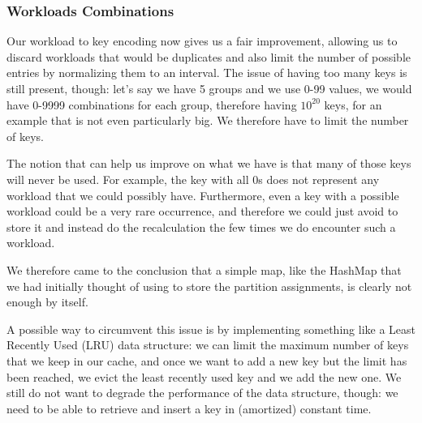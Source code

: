 \subsubsection{Workloads Combinations}\label{sec:Workloads-combinations}
Our workload to key encoding now gives us a fair improvement, allowing us to discard workloads that would be duplicates and also limit the number of possible entries by normalizing them to an interval. The issue of having too many keys is still present, though: let's say we have 5 groups and we use 0-99 values, we would have 0-9999 combinations for each group, therefore having $10^{20}$ keys, for an example that is not even particularly big. We therefore have to limit the number of keys. 

The notion that can help us improve on what we have is that many of those keys will never be used. For example, the key with all 0s does not represent any workload that we could possibly have. Furthermore, even a key with a possible workload could be a very rare occurrence, and therefore we could just avoid to store it and instead do the recalculation the few times we do encounter such a workload. 

We therefore came to the conclusion that a simple map, like the HashMap that we had initially thought of using to store the partition assignments, is clearly not enough by itself.

A possible way to circumvent this issue is by implementing something like a Least Recently Used (LRU) data structure: we can limit the maximum number of keys that we keep in our cache, and once we want to add a new key but the limit has been reached, we evict the least recently used key and we add the new one. We still do not want to degrade the performance of the data structure, though: we need to be able to retrieve and insert a key in (amortized) constant time.


